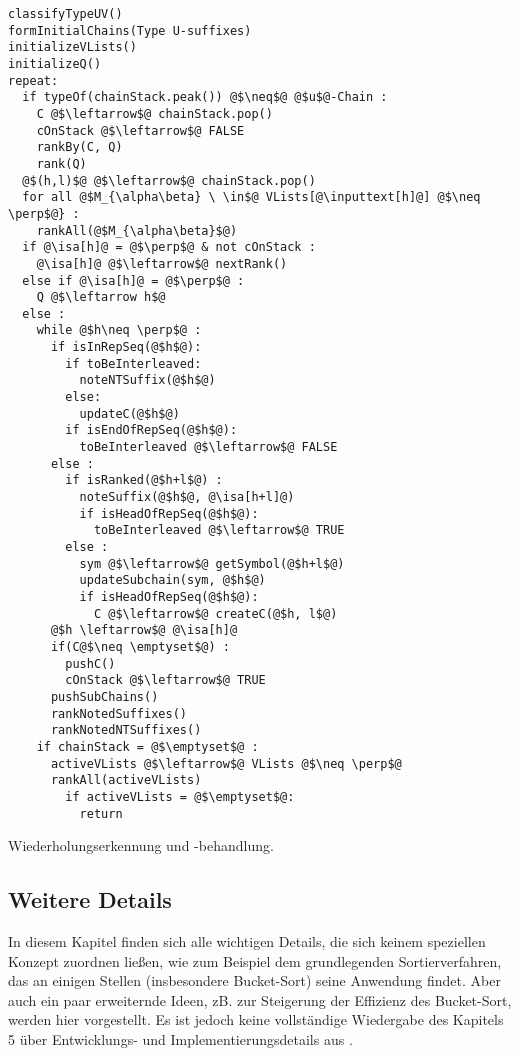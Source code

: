 \begin{listing}[htp]
\begin{verbatim}
classifyTypeUV()
formInitialChains(Type U-suffixes)
initializeVLists()
initializeQ()
repeat:
  if typeOf(chainStack.peak()) @$\neq$@ @$u$@-Chain :
    C @$\leftarrow$@ chainStack.pop()
    cOnStack @$\leftarrow$@ FALSE
    rankBy(C, Q)
    rank(Q) 
  @$(h,l)$@ @$\leftarrow$@ chainStack.pop()	
  for all @$M_{\alpha\beta} \ \in$@ VLists[@\inputtext[h]@] @$\neq \perp$@} :
    rankAll(@$M_{\alpha\beta}$@)  
  if @\isa[h]@ = @$\perp$@ & not cOnStack :
    @\isa[h]@ @$\leftarrow$@ nextRank()	
  else if @\isa[h]@ = @$\perp$@ :
    Q @$\leftarrow h$@	
  else :
    while @$h\neq \perp$@ :   
      if isInRepSeq(@$h$@):
        if toBeInterleaved:
          noteNTSuffix(@$h$@)
        else:
          updateC(@$h$@)          
        if isEndOfRepSeq(@$h$@):
          toBeInterleaved @$\leftarrow$@ FALSE      
      else :
        if isRanked(@$h+l$@) :
          noteSuffix(@$h$@, @\isa[h+l]@)
          if isHeadOfRepSeq(@$h$@):
            toBeInterleaved @$\leftarrow$@ TRUE       
        else :
          sym @$\leftarrow$@ getSymbol(@$h+l$@)
          updateSubchain(sym, @$h$@)
          if isHeadOfRepSeq(@$h$@):
            C @$\leftarrow$@ createC(@$h, l$@)
      @$h \leftarrow$@ @\isa[h]@	
	  if(C@$\neq \emptyset$@) :
	    pushC()
	    cOnStack @$\leftarrow$@ TRUE	    
      pushSubChains()	
      rankNotedSuffixes()
      rankNotedNTSuffixes()   	
    if chainStack = @$\emptyset$@ :
      activeVLists @$\leftarrow$@ VLists @$\neq \perp$@
      rankAll(activeVLists)
        if activeVLists = @$\emptyset$@:
          return
\end{verbatim}
\caption{Wiederholungserkennung und -behandlung.}
\label{wiedSeq}
\end{listing}


\subsection{Weitere Details} \label{Details}

In diesem Kapitel finden sich alle wichtigen Details, die sich keinem speziellen Konzept zuordnen ließen, wie zum Beispiel dem grundlegenden Sortierverfahren, das an einigen Stellen (insbesondere Bucket-Sort) seine Anwendung findet. Aber auch ein paar erweiternde Ideen, zB. zur Steigerung der Effizienz des Bucket-Sort, werden hier vorgestellt.
Es ist jedoch keine vollständige Wiedergabe des Kapitels 5 über \glqq Entwicklungs- und Implementierungsdetails\grqq{} aus \cite{saca:8}.

